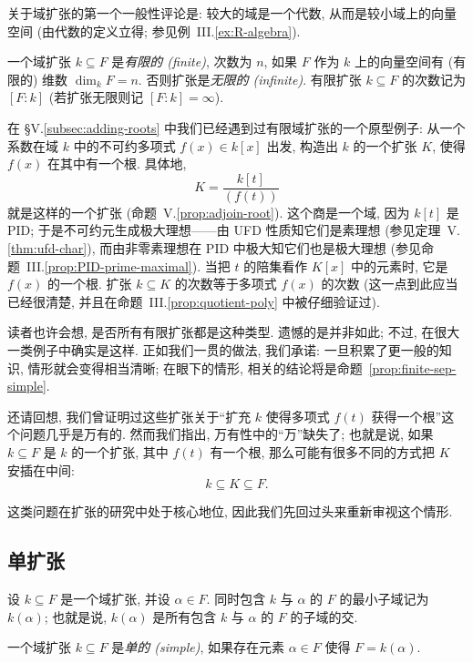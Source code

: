 关于域扩张的第一个一般性评论是: 较大的域是一个代数, 从而是较小域上的向量空间 (由代数的定义立得; 参见例~III.\ref{ex:R-algebra}).

\begin{definition}\label{def:finite-extension}
一个域扩张 $k\subseteq F$ 是\emph{有限的 (finite)}, 次数为 $n$, 如果 $F$ 作为 $k$ 上的向量空间有 (有限的) 维数 $\dim_k F=n$. 否则扩张是\emph{无限的 (infinite)}.
有限扩张 $k\subseteq F$ 的次数记为 $[F:k]$ (若扩张无限则记 $[F:k]=\infty$).
\end{definition}

在 §V.\ref{subsec:adding-roots} 中我们已经遇到过有限域扩张的一个原型例子: 从一个系数在域 $k$ 中的不可约多项式 $f(x)\in k[x]$ 出发, 构造出 $k$ 的一个扩张 $K$, 使得 $f(x)$ 在其中有一个根. 具体地,
\[
K=\frac{k[t]}{(f(t))}
\]
就是这样的一个扩张 (命题~V.\ref{prop:adjoin-root}). 这个商是一个域, 因为 $k[t]$ 是 PID; 于是不可约元生成极大理想——由 UFD 性质知它们是素理想 (参见定理~V.\ref{thm:ufd-char}), 而由非零素理想在 PID 中极大知它们也是极大理想 (参见命题~III.\ref{prop:PID-prime-maximal}). 当把 $t$ 的陪集看作 $K[x]$ 中的元素时, 它是 $f(x)$ 的一个根. 扩张 $k\subseteq K$ 的次数等于多项式 $f(x)$ 的次数 (这一点到此应当已经很清楚, 并且在命题~III.\ref{prop:quotient-poly} 中被仔细验证过).

读者也许会想, 是否所有有限扩张都是这种类型. 遗憾的是并非如此; 不过, 在很大一类例子中确实是这样. 正如我们一贯的做法, 我们承诺: 一旦积累了更一般的知识, 情形就会变得相当清晰; 在眼下的情形, 相关的结论将是命题~\ref{prop:finite-sep-simple}.

还请回想, 我们曾证明过这些扩张关于``扩充 $k$ 使得多项式 $f(t)$ 获得一个根''这个问题几乎是万有的. 然而我们指出, 万有性中的``万''缺失了; 也就是说, 如果 $k\subseteq F$ 是 $k$ 的一个扩张, 其中 $f(t)$ 有一个根, 那么可能有很多不同的方式把 $K$ 安插在中间:
\[
k\subseteq K\subseteq F.
\]

这类问题在扩张的研究中处于核心地位, 因此我们先回过头来重新审视这个情形.

\subsection{单扩张}
\label{subsec:simple-extensions}

设 $k\subseteq F$ 是一个域扩张, 并设 $\alpha\in F$. 同时包含 $k$ 与 $\alpha$ 的 $F$ 的最小子域记为 $k(\alpha)$; 也就是说, $k(\alpha)$ 是所有包含 $k$ 与 $\alpha$ 的 $F$ 的子域的交.

\begin{definition}\label{def:simple-extension}
一个域扩张 $k\subseteq F$ 是\emph{单的 (simple)}, 如果存在元素 $\alpha\in F$ 使得 $F=k(\alpha)$.
\end{definition}

